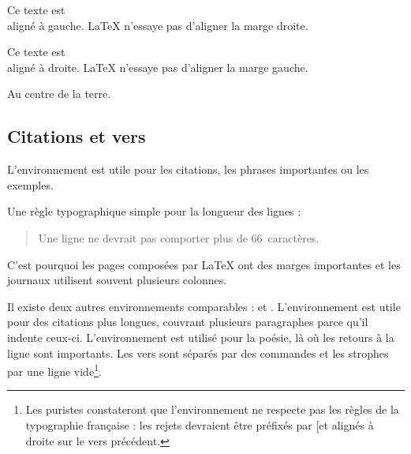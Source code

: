 \begin{example}
\begin{flushleft}
Ce texte est\\
aligné à gauche.
\LaTeX{} n'essaye pas
d'aligner la marge droite.
\end{flushleft}
\end{example}

\begin{example}
\begin{flushright}
Ce texte est\\
aligné à droite.
\LaTeX{} n'essaye pas
d'aligner la marge gauche.
\end{flushright}
\end{example}

\begin{example}
\begin{center}
Au centre de la terre.
\end{center}
\end{example}

\subsection{Citations et vers}

L'environnement  est utile pour les citations, les phrases
importantes ou les exemples.

\begin{example}
Une règle typographique
simple pour la longueur
des lignes :
\begin{quote}
Une ligne ne devrait pas comporter
plus de 66~caractères.
\end{quote}
C'est pourquoi les pages
composées par \LaTeX{} ont des
marges importantes et
les journaux utilisent
souvent plusieurs colonnes.
\end{example}

Il existe deux autres environnements comparables :  et
. L'environnement  est utile pour des
citations plus longues, couvrant plusieurs
paragraphes parce qu'il indente ceux-ci.
L'environnement  est utilisé pour la poésie, là
où les retours à la ligne sont importants. Les vers sont séparés par
des commandes \ci{\bs} et les strophes par une ligne vide\footnote{Les
puristes constateront que l'environnement  ne respecte pas
les règles de la typographie française : les rejets devraient être
préfixés par \og [\iffalse]\fi \fg et alignés à droite sur le vers précédent.}.

